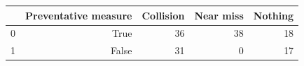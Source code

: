 \begin{tabular}{lrrrr}
\toprule
 & Preventative measure & Collision & Near miss & Nothing \\
\midrule
0 & True & 36 & 38 & 18 \\
1 & False & 31 & 0 & 17 \\
\bottomrule
\end{tabular}
